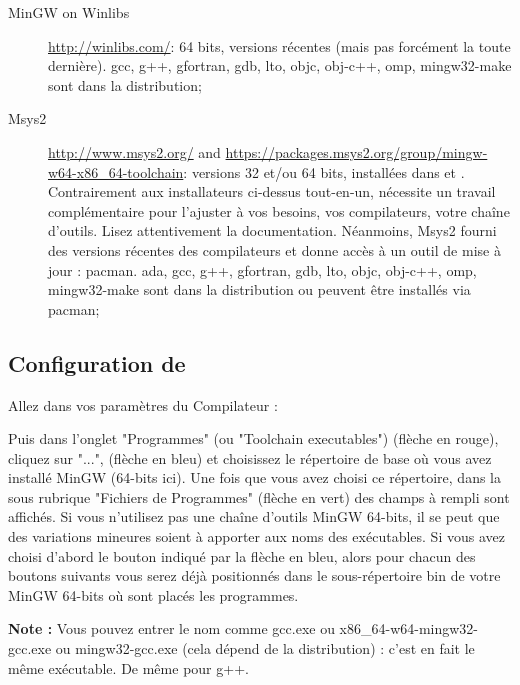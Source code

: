 \begin{description}
\item[MinGW on Winlibs] \url{http://winlibs.com/}: 64 bits, versions récentes (mais pas forcément la toute dernière). gcc, g++, gfortran, gdb, lto, objc, obj-c++, omp, mingw32-make sont dans la distribution;
\item[Msys2] \url{http://www.msys2.org/} and \url{https://packages.msys2.org/group/mingw-w64-x86_64-toolchain}: versions 32 et/ou 64 bits, installées dans  et . Contrairement aux installateurs ci-dessus tout-en-un, nécessite un travail complémentaire pour l'ajuster à vos besoins, vos compilateurs, votre chaîne d'outils. Lisez attentivement la documentation. Néanmoins, Msys2 fourni des versions récentes des compilateurs et donne accès à un outil de mise à jour : pacman. ada, gcc, g++, gfortran, gdb, lto, objc, obj-c++, omp, mingw32-make sont dans la distribution ou peuvent être installés via pacman;
\end{description}

\subsection{Configuration de \codeblocks}

Allez dans vos paramètres du Compilateur :


Puis dans l'onglet "Programmes" (ou "Toolchain executables") (flèche en rouge), cliquez sur "...", (flèche en bleu) et choisissez le répertoire de base où vous avez installé MinGW (64-bits ici). Une fois que vous avez choisi ce répertoire, dans la sous rubrique "Fichiers de Programmes" (flèche en vert) des champs à rempli sont affichés. Si vous n'utilisez pas une chaîne d'outils MinGW 64-bits, il se peut que des variations mineures soient à apporter aux noms des exécutables. Si vous avez choisi d'abord le bouton indiqué par la flèche en bleu, alors pour chacun des boutons suivants vous serez déjà positionnés dans le sous-répertoire bin de votre MinGW 64-bits où sont placés les programmes.


\textbf{Note :} Vous pouvez entrer le nom comme gcc.exe ou x86\_64-w64-mingw32-gcc.exe ou mingw32-gcc.exe (cela dépend de la distribution) : c'est en fait le même exécutable. De même pour g++.

